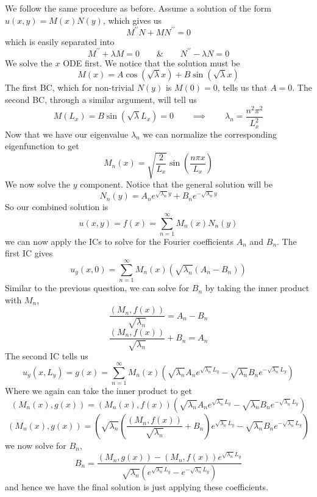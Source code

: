 \documentclass[10pt]{article}
\begin{document}
We follow the same procedure as before. Assume a solution of the form $u(x,y) = M(x)N(y)$, which gives us
$$M^{\prime\prime}N + MN^{\prime\prime} = 0$$
which is easily separated into
$$M^{\prime\prime} +\lambda M =0 \hspace{2em} \& \hspace{2em} N^{\prime\prime} - \lambda N = 0$$
We solve the $x$ ODE first. We notice that the solution must be
$$M(x) = A\cos(\sqrt{\lambda}x) + B\sin(\sqrt{\lambda}x)$$
The first BC, which for non-trivial $N(y)$ is $M(0) = 0$, tells us that $A = 0$. The second BC, through a similar argument, will tell us
$$M(L_{x}) = B\sin(\sqrt{\lambda}L_{x}) = 0 \hspace{2em} \implies \hspace{2em} \lambda_{n} = \frac{n^{2}\pi^{2}}{L_{x}^{2}}$$
Now that we have our eigenvalue $\lambda_{n}$ we can normalize the corresponding eigenfunction to get
$$M_{n}(x) = \sqrt{\frac{2}{L_{x}}}\sin\left(\frac{n\pi x}{L_{x}}\right)$$
We now solve the $y$ component. Notice that the general solution will be
$$N_{n}(y) = A_{n}e^{\sqrt{\lambda_{n}}y} + B_{n}e^{-\sqrt{\lambda_{n}}y}$$
So our combined solution is
$$u(x,y) = f(x) = \sum_{n=1}^{\infty}M_{n}(x)N_{n}(y)$$
we can now apply the ICs to solve for the Fourier coefficients $A_{n}$ and $B_{n}$. The first IC gives
$$u_{y}(x,0) = \sum_{n=1}^{\infty}M_{n}(x)\left(\sqrt{\lambda_{n}}(A_{n} - B_{n})\right)$$
Similar to the previous question, we can solve for $B_{n}$ by taking the inner product with $M_{n}$,
$$\frac{\left(M_{n}, f(x)\right)}{\sqrt{\lambda_{n}}} =A_{n} - B_{n}$$
$$\frac{\left(M_{n}, f(x)\right)}{\sqrt{\lambda_{n}}} + B_{n} = A_{n}$$
The second IC tells us
$$u_{y}(x, L_{y}) = g(x) = \sum_{n=1}^{\infty}M_{n}(x) \left(\sqrt{\lambda_{n}}A_{n}e^{\sqrt{\lambda_{n}}L_{y}} - \sqrt{\lambda_{n}}B_{n}e^{-\sqrt{\lambda_{n}}L_{y}}\right)$$
Where we again can take the inner product to get
$$(M_{n}(x),g(x)) = (M_{n}(x),f(x))\left(\sqrt{\lambda_{n}}A_{n}e^{\sqrt{\lambda_{n}}L_{y}} - \sqrt{\lambda_{n}}B_{n}e^{-\sqrt{\lambda_{n}}L_{y}}\right)$$
$$(M_{n}(x),g(x)) = \left(\sqrt{\lambda_{n}}\left(\frac{\left(M_{n}, f(x)\right)}{\sqrt{\lambda_{n}}} + B_{n}\right)e^{\sqrt{\lambda_{n}}L_{y}} - \sqrt{\lambda_{n}}B_{n}e^{-\sqrt{\lambda_{n}}L_{y}}\right)$$
we now solve for $B_{n}$,
$$B_{n} = \frac{(M_{n},g(x)) - (M_{n},f(x))e^{\sqrt{\lambda_{n}}L_{y}}}{\sqrt{\lambda_{n}}\left(e^{\sqrt{\lambda_{n}}L_{y}} - e^{-\sqrt{\lambda_{n}}L_{y}}\right)}$$
and hence we have the final solution is just applying these coefficients.
\end{document}
